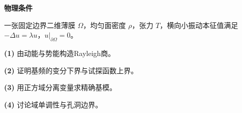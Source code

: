 \textbf{物理条件}\par 一张固定边界二维薄膜 \(\Omega\)，均匀面密度 \(\rho\)，张力 \(T\)，横向小振动本征值满足 \(-\Delta u=\lambda u\)，\(u|_{\partial\Omega}=0\)。
\par\noindent\textbf{(1)} 由动能与势能构造Rayleigh商。
\par\noindent\textbf{(2)} 证明基频的变分下界与试探函数上界。
\par\noindent\textbf{(3)} 用正方域分离变量求精确基模。
\par\noindent\textbf{(4)} 讨论域单调性与孔洞边界。
